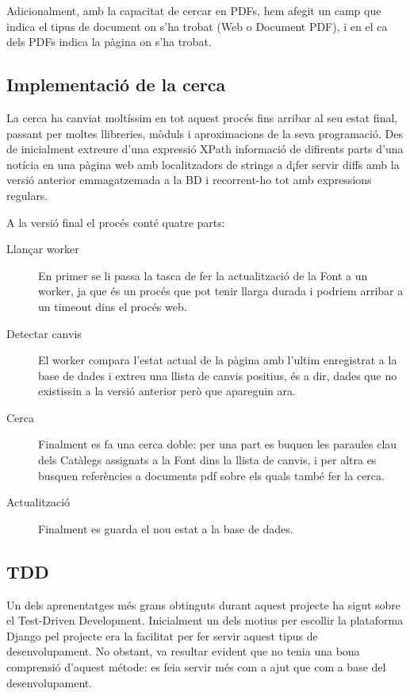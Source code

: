 \documentclass{article}
\begin{document}
Adicionalment, amb la capacitat de cercar en PDFs, hem afegit un camp que indica el tipus de document on s'ha trobat (Web o Document PDF), i en el ca dels PDFs indica la pàgina on s'ha trobat.

\newpage

\subsection{Implementació de la cerca}

La cerca ha canviat moltíssim en tot aquest procés fins arribar al seu estat final, passant per moltes llibreries, mòduls i aproximacions de la seva programació. Des de inicialment extreure d'una expressió XPath informació de difirents parts d'una notícia en una pàgina web amb localitzadors de strings a d¡fer servir diffs amb la versió anterior emmagatzemada a la BD i recorrent-ho tot amb expressions regulars.

A la versió final el procés conté quatre parts:

\begin{description}
    \item[Llançar worker] En primer se li passa la tasca de fer la actualització de la Font a un worker, ja que és un procés que pot tenir llarga durada i podriem arribar a un timeout dins el procés web.
    \item[Detectar canvis] El worker compara l'estat actual de la pàgina amb l'ultim enregistrat a la base de dades i extreu una llista de canvis positius, és a dir, dades que no existissin a la versió anterior però que apareguin ara.
    \item[Cerca] Finalment es fa una cerca doble: per una part es buquen les paraules clau dels Catàlegs assignats a la Font dins la llista de canvis, i per altra es busquen referències a documents pdf sobre els quals també fer la cerca.
    \item[Actualització] Finalment es guarda el nou estat a la base de dades.
\end{description}

\newpage

\subsection{TDD}

Un dels aprenentatges més grans obtinguts durant aquest projecte ha sigut sobre el Test-Driven Development. Inicialment un dels motius per escollir la plataforma Django pel projecte era la facilitat per fer servir aquest tipus de desenvolupament. No obstant, va resultar evident que no tenia una bona comprensió d'aquest métode: es feia servir més com a ajut que com a base del desenvolupament.
\end{document}
